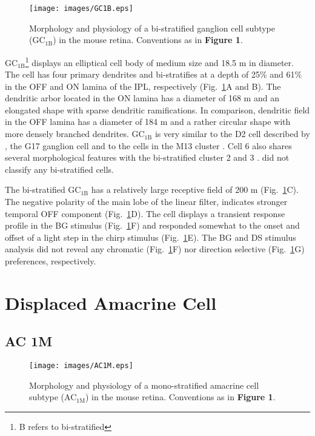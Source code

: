 \begin{figure}[t]
\begin{center}
\texttt{[image: images/GC1B.eps]}
\caption{Morphology and physiology of a bi-stratified ganglion cell subtype (GC$_\text{{1B}}$) in the mouse retina. Conventions as in \textbf{Figure 1}.}
\label{figure8}
\end{center}
\end{figure}

GC$_{\text{1B}}$\footnote{B refers to bi-stratified} displays an elliptical cell body of medium size and 18.5 \textmu m in diameter. The cell has four primary dendrites and bi-stratifies at a depth of 25\% and 61\% in the OFF and ON lamina of the IPL, respectively (Fig.~\ref{figure8}A and B). The dendritic arbor located in the ON lamina has a diameter of 168 \textmu m and an elongated shape with sparse dendritic ramifications. In comparison, dendritic field in the OFF lamina has a diameter of 184 \textmu m and a rather circular shape with more densely branched dendrites. GC$_{\text{1B}}$ is very similar to the D2 cell described by \citealp{sun02}, the G17 ganglion cell \citep{voelgyi09} and to the cells in the M13 cluster \citep{coombs06}. Cell 6 also shares several morphological features with the bi-stratified cluster 2 and 3 \citep{badea04}. \citet{kong05} did not classify any bi-stratified cells. 

The bi-stratified GC$_{\text{1B}}$ has a relatively large receptive field of 200 \textmu m (Fig.~\ref{figure8}C). The negative polarity of the main lobe of the linear filter, indicates stronger temporal OFF component (Fig.~\ref{figure8}D). The cell displays a transient response profile in the BG stimulus (Fig.~\ref{figure8}F) and responded somewhat to the onset and offset of a light step in the chirp stimulus (Fig.~\ref{figure8}E). The BG and DS stimulus analysis did not reveal any chromatic (Fig.~\ref{figure8}F) nor direction selective (Fig.~\ref{figure8}G) preferences, respectively.


\section{Displaced Amacrine Cell}
\subsection{AC 1M}     

\begin{figure}[t]
\begin{center}
\texttt{[image: images/AC1M.eps]}
\caption{Morphology and physiology of a mono-stratified amacrine cell subtype (AC$_\text{{1M}}$) in the mouse retina. Conventions as in \textbf{Figure 1}.}
\label{figure9}
\end{center}
\end{figure}

